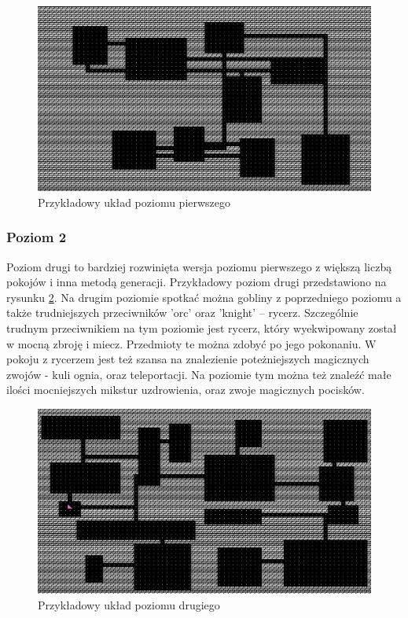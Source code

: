 \documentclass[12pt,twoside]{article}
\begin{document}
\FloatBarrier
\begin{figure}[h]
	\centering
	\includegraphics[width=12cm]{images/mygame/map1.png}
	\caption{Przykładowy układ poziomu pierwszego}
	\label{mygame:map1}
\end{figure}
\FloatBarrier


\subsubsection{Poziom 2}
Poziom drugi to bardziej rozwinięta wersja poziomu pierwszego z większą liczbą pokojów i inna metodą generacji. Przykładowy poziom drugi przedstawiono na rysunku \ref{mygame:map2}. Na drugim poziomie spotkać można gobliny z poprzedniego poziomu a także trudniejszych przeciwników 'orc' oraz 'knight' -- rycerz. Szczególnie trudnym przeciwnikiem na tym poziomie jest rycerz, który wyekwipowany został w mocną zbroję i miecz. Przedmioty te można zdobyć  po jego pokonaniu. W pokoju z rycerzem jest też szansa na znalezienie poteżniejszych magicznych zwojów - kuli ognia, oraz  teleportacji. Na poziomie tym można też znaleźć małe ilości mocniejszych mikstur uzdrowienia, oraz zwoje magicznych pocisków.


\FloatBarrier
\begin{figure}[h]
	\centering
	\includegraphics[width=12cm]{images/mygame/map2.png}
	\caption{Przykładowy układ poziomu drugiego}
	\label{mygame:map2}
\end{figure}
\FloatBarrier
\end{document}
